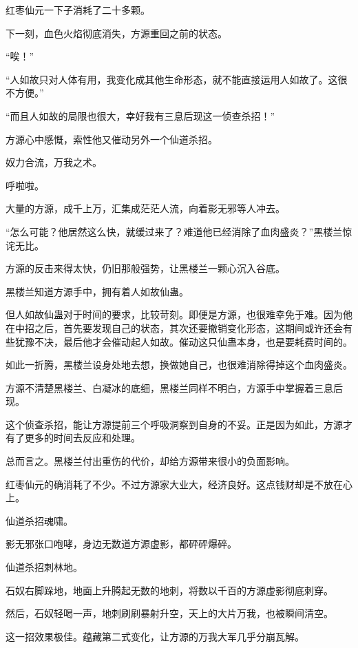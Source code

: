 
\begin{this_body}

红枣仙元一下子消耗了二十多颗。

下一刻，血色火焰彻底消失，方源重回之前的状态。

“唉！”

“人如故只对人体有用，我变化成其他生命形态，就不能直接运用人如故了。这很不方便。”

“而且人如故的局限也很大，幸好我有三息后现这一侦查杀招！”

方源心中感慨，索性他又催动另外一个仙道杀招。

奴力合流，万我之术。

呼啦啦。

大量的方源，成千上万，汇集成茫茫人流，向着影无邪等人冲去。

“怎么可能？他居然这么快，就缓过来了？难道他已经消除了血肉盛炎？”黑楼兰惊诧无比。

方源的反击来得太快，仍旧那般强势，让黑楼兰一颗心沉入谷底。

黑楼兰知道方源手中，拥有着人如故仙蛊。

但人如故仙蛊对于时间的要求，比较苛刻。即便是方源，也很难幸免于难。因为他在中招之后，首先要发现自己的状态，其次还要撤销变化形态，这期间或许还会有些犹豫不决，最后他才会催动起人如故。催动这只仙蛊本身，也是要耗费时间的。

如此一折腾，黑楼兰设身处地去想，换做她自己，也很难消除得掉这个血肉盛炎。

方源不清楚黑楼兰、白凝冰的底细，黑楼兰同样不明白，方源手中掌握着三息后现。

这个侦查杀招，能让方源提前三个呼吸洞察到自身的不妥。正是因为如此，方源才有了更多的时间去反应和处理。

总而言之。黑楼兰付出重伤的代价，却给方源带来很小的负面影响。

红枣仙元的确消耗了不少。不过方源家大业大，经济良好。这点钱财却是不放在心上。

仙道杀招魂啸。

影无邪张口咆哮，身边无数道方源虚影，都砰砰爆碎。

仙道杀招刺林地。

石奴右脚跺地，地面上升腾起无数的地刺，将数以千百的方源虚影彻底刺穿。

然后，石奴轻喝一声，地刺刷刷暴射升空，天上的大片万我，也被瞬间清空。

这一招效果极佳。蕴藏第二式变化，让方源的万我大军几乎分崩瓦解。


\end{this_body}
